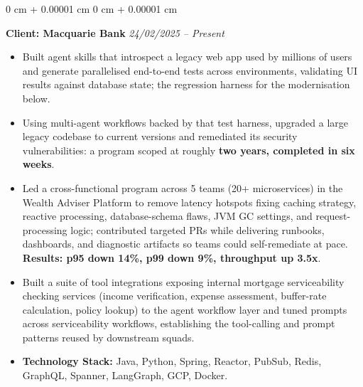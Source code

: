 \documentclass[10pt, letterpaper]{article}
\newenvironment{onecolentry}{
    \begin{adjustwidth}{
        0 cm + 0.00001 cm
    }{
        0 cm + 0.00001 cm
    }
}{
    \end{adjustwidth}
} %
\begin{document}
\begin{onecolentry}
            \vspace{0.10 cm}
            \hspace{0.5cm}\textbf{Client: Macquarie Bank} \hfill \textit{24/02/2025 -- Present}
            \begin{itemize}[
                topsep=0.10 cm,
                parsep=0.10 cm,
                partopsep=0pt,
                itemsep=0pt,
                leftmargin=0 cm + 10pt + 0.5cm
            ]
                \item Built agent skills that introspect a legacy web app used by millions of users and generate parallelised end-to-end tests across environments, validating UI results against database state; the regression harness for the modernisation below.
                \item Using multi-agent workflows backed by that test harness, upgraded a large legacy codebase to current versions and remediated its security vulnerabilities: a program scoped at roughly \textbf{two years, completed in six weeks}.
                \item Led a cross-functional program across 5 teams (20+ microservices) in the Wealth Adviser Platform to remove latency hotspots fixing caching strategy, reactive processing, database-schema flaws, JVM GC settings, and request-processing logic; contributed targeted PRs while delivering runbooks, dashboards, and diagnostic artifacts so teams could self-remediate at pace. \textbf{Results: p95 down 14\%, p99 down 9\%, throughput up 3.5x}.
                \item Built a suite of tool integrations exposing internal mortgage serviceability checking services (income verification, expense assessment, buffer-rate calculation, policy lookup) to the agent workflow layer and tuned prompts across serviceability workflows, establishing the tool-calling and prompt patterns reused by downstream squads.
                \item \textbf{Technology Stack:} Java, Python, Spring, Reactor, PubSub, Redis, GraphQL, Spanner, LangGraph, GCP, Docker.
            \end{itemize}


\end{onecolentry}
\end{document}
